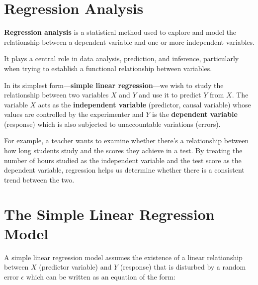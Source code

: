 \documentclass[twoside]{book}
\begin{document}



\section{Regression Analysis}

\begin{textbox}
    \textbf{Regression analysis} is a statistical method used to explore and model the relationship between a dependent variable and one or more independent variables.
\end{textbox}
 It plays a central role in data analysis, prediction, and inference, particularly when trying to establish a functional relationship between variables.

In its simplest form—\textbf{simple linear regression}—we wish to study the relationship between two variables $X$ and $Y$ and use it to predict $Y$ from $X$. The variable $X$ acts as the \textbf{independent variable} (predictor, causal variable) whose values are controlled by the experimenter and $Y$ is the \textbf{dependent variable} (response) which is also subjected to unaccountable variations (errors).

For example, a teacher wants to examine whether there's a relationship between how long students study and the scores they achieve in a test. By treating the number of hours studied as the independent variable and the test score as the dependent variable, regression helps us determine whether there is a consistent trend between the two.

\section{The Simple Linear Regression Model}

A simple linear regression model assumes the existence of a linear relationship between $X$ (predictor variable) and $Y$ (response) that is disturbed by a random error $\epsilon$ which can be written as an equation of the form:
\end{document}
